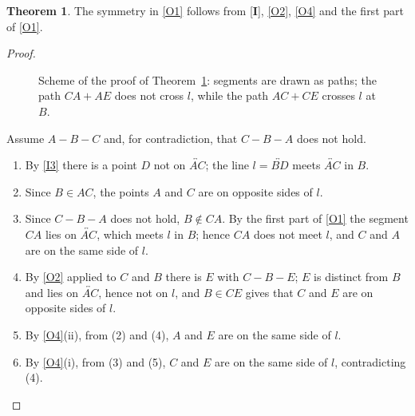 \documentclass[11pt]{amsart}
\theoremstyle{definition}
\newtheorem{thm}{Theorem}[section]
\theoremstyle{remark}
\begin{document}
\begin{thm}\label{thm:sym}
The symmetry in \ref{O1} follows from [\textbf{I}], \ref{O2}, \ref{O4} and the first part of \ref{O1}.
\end{thm}
\begin{proof}
\begin{figure}
  \centering
{}
\caption{Scheme of the proof of Theorem~\ref{thm:sym}: segments are drawn as paths; the path $CA+AE$ does not cross $l$, while the path $AC+CE$ crosses $l$ at $B$.}\label{fig:sym}
\end{figure}
Assume $A-B-C$ and, for contradiction, that $C-B-A$ does not hold.
\begin{enumerate}[label=(\arabic*)]
\item By \ref{I3} there is a point $D$ not on $\overleftrightarrow{AC}$; the line $l=\overleftrightarrow{BD}$ meets $\overleftrightarrow{AC}$ in $B$.
\item Since $B\in AC$, the points $A$ and $C$ are on opposite sides of $l$.
\item Since $C-B-A$ does not hold, $B\notin CA$. By the first part of \ref{O1} the segment $CA$ lies on $\overleftrightarrow{AC}$, which meets $l$ in $B$; hence $CA$ does not meet $l$, and $C$ and $A$ are on the same side of $l$.
\item By \ref{O2} applied to $C$ and $B$ there is $E$ with $C-B-E$; $E$ is distinct from $B$ and lies on $\overleftrightarrow{AC}$, hence not on $l$, and $B\in CE$ gives that $C$ and $E$ are on opposite sides of $l$.
\item By \ref{O4}(ii), from (2) and (4), $A$ and $E$ are on the same side of $l$.
\item By \ref{O4}(i), from (3) and (5), $C$ and $E$ are on the same side of $l$, contradicting (4).\qedhere
\end{enumerate}
\end{proof}
\end{document}
